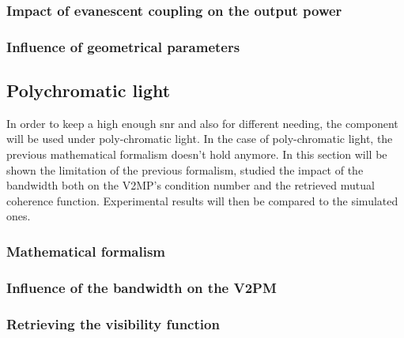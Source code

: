 \documentclass[a4paper,twoside,11pt]{article}
\begin{document}
        \subsubsection{Impact of evanescent coupling on the output power}
        
        
        \subsubsection{Influence of geometrical parameters}
        
        
    
    \subsection{Polychromatic light}
    In order to keep a high enough \gls{snr} and also for different needing, the component will be used under poly-chromatic light. In the case of poly-chromatic light, the previous mathematical formalism doesn't hold anymore. In this section will be shown the limitation of the previous formalism, studied the impact of the bandwidth both on the V2MP's condition number and the retrieved mutual coherence function. Experimental results will then be compared to the simulated ones. 
    
        \subsubsection{Mathematical formalism}\label{sec:mathpoly}
        
        
        \subsubsection{Influence of the bandwidth on the V2PM}
        
        
        \subsubsection{Retrieving the visibility function}
        
\end{document}
